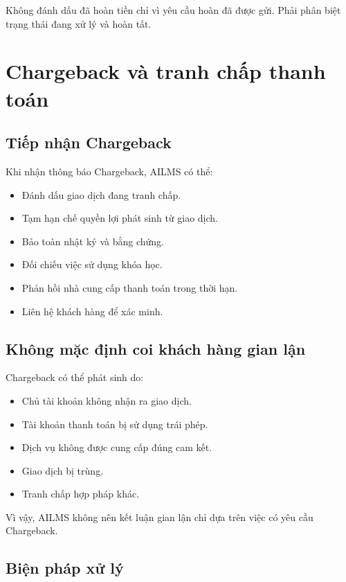 \documentclass[12pt,a4paper]{article}
\begin{document}
Không đánh dấu đã hoàn tiền chỉ vì yêu cầu hoàn đã được gửi.
Phải phân biệt trạng thái đang xử lý và hoàn tất.

\section{Chargeback và tranh chấp thanh toán}

\subsection{Tiếp nhận Chargeback}

Khi nhận thông báo Chargeback, AILMS có thể:

\begin{itemize}
    \item Đánh dấu giao dịch đang tranh chấp.
    \item Tạm hạn chế quyền lợi phát sinh từ giao dịch.
    \item Bảo toàn nhật ký và bằng chứng.
    \item Đối chiếu việc sử dụng khóa học.
    \item Phản hồi nhà cung cấp thanh toán trong thời hạn.
    \item Liên hệ khách hàng để xác minh.
\end{itemize}

\subsection{Không mặc định coi khách hàng gian lận}

Chargeback có thể phát sinh do:

\begin{itemize}
    \item Chủ tài khoản không nhận ra giao dịch.
    \item Tài khoản thanh toán bị sử dụng trái phép.
    \item Dịch vụ không được cung cấp đúng cam kết.
    \item Giao dịch bị trùng.
    \item Tranh chấp hợp pháp khác.
\end{itemize}

Vì vậy, AILMS không nên kết luận gian lận
chỉ dựa trên việc có yêu cầu Chargeback.

\subsection{Biện pháp xử lý}
\end{document}
